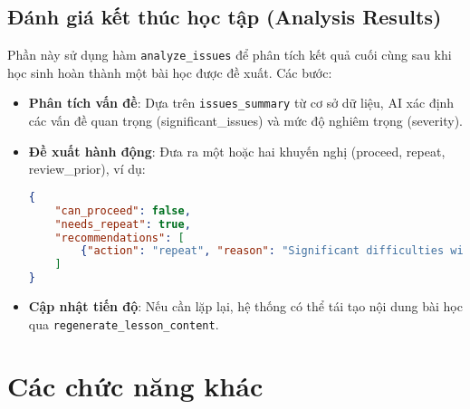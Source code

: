 \subsection{Đánh giá kết thúc học tập (Analysis Results)}
Phần này sử dụng hàm \texttt{analyze\_issues} để phân tích kết quả cuối cùng sau khi học sinh hoàn thành một bài học được đề xuất. Các bước:
\begin{itemize}
    \item \textbf{Phân tích vấn đề}: Dựa trên \texttt{issues\_summary} từ cơ sở dữ liệu, AI xác định các vấn đề quan trọng (significant\_issues) và mức độ nghiêm trọng (severity).
    \item \textbf{Đề xuất hành động}: Đưa ra một hoặc hai khuyến nghị (proceed, repeat, review\_prior), ví dụ:
    \begin{lstlisting}[language=JSON]
{
    "can_proceed": false,
    "needs_repeat": true,
    "recommendations": [
        {"action": "repeat", "reason": "Significant difficulties with recursion...", "details": "Review 'Advanced Recursion'"}
    ]
}
    \end{lstlisting}
    \item \textbf{Cập nhật tiến độ}: Nếu cần lặp lại, hệ thống có thể tái tạo nội dung bài học qua \texttt{regenerate\_lesson\_content}.
\end{itemize}

\section{Các chức năng khác}

